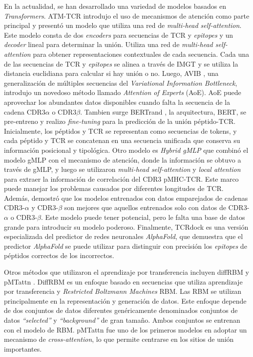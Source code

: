 En la actualidad, se han desarrollado una variedad de modelos basados en \textit{Transformers}. ATM-TCR \citep{cai2022atm} introdujo el uso de mecanismos de atención como parte principal y presentó un modelo que utiliza una red de \textit{multi-head self-attention}. Este modelo consta de dos \textit{encoders} para secuencias de TCR y \textit{epitopes} y un \textit{decoder} lineal para determinar la unión. Utiliza una red de \textit{multi-head self-attention} para obtener representaciones contextuales de cada secuencia. Cada una de las secuencias de TCR y \textit{epitopes} se alinea a través de IMGT y se utiliza la distancia euclidiana para calcular si hay unión o no. Luego, AVIB \citep{10.1093/bioinformatics/btac820}, una generalización de múltiples secuencias del \textit{Variational Information Bottleneck}, introdujo un novedoso método llamado \textit{Attention of Experts} (AoE). AoE puede aprovechar los abundantes datos disponibles cuando falta la secuencia de la cadena CDR3$\alpha$ o CDR3$\beta$. Tambien surge BERTrand \citep{myronov2023bertrand}, la arquitectura, BERT, se pre-entreno y realizo \textit{fine-tuning} para la predicción de la unión péptido-TCR. Inicialmente, los péptidos y TCR se representan como secuencias de tokens, y cada péptido y TCR se concatenan en una secuencia unificada que conserva su información posicional y tipológica. Otro modelo es \textit{Hybrid gMLP} \citep{zhang2023hybrid} que combinó el modelo gMLP con el mecanismo de atención, donde la información se obtuvo a través de gMLP, y luego se utilizaron \textit{multi-head self-attention} y \textit{local attention} para extraer la información de correlación del CDR3 pMHC-TCR. Este marco puede manejar los problemas causados por diferentes longitudes de TCR. Además, demostró que los modelos entrenados con datos emparejados de cadenas CDR3-$\alpha$ y CDR3-$\beta$ son mejores que aquellos entrenados solo con datos de CDR3-$\alpha$ o CDR3-$\beta$. Este modelo puede tener potencial, pero le falta una base de datos grande para introducir su modelo poderoso. Finalmente, TCRdock \citep{bradley2023structure} es una versión especializada del predictor de redes neuronales \textit{AlphaFold}, que demuestra que el predictor \textit{AlphaFold} se puede utilizar para distinguir con precisión los \textit{epitopes} de péptidos correctos de los incorrectos. 

Otros métodos que utilizaron el aprendizaje por transferencia incluyen diffRBM \citep{bravi2023transfer} y pMTattn \citep{9994875}. DiffRBM es un enfoque basado en secuencias que utiliza aprendizaje por transferencia y \textit{Restricted Boltzmann Machines} RBM. Las RBM se utilizan principalmente en la representación y generación de datos. Este enfoque depende de dos conjuntos de datos diferentes genéricamente denominados conjuntos de datos \textit{``selected''} y \textit{``background''} de gran tamaño. Ambos conjuntos se entrenan con el modelo de RBM. pMTattn fue uno de los primeros modelos en adoptar un mecanismo de \textit{cross-attention}, lo que permite centrarse en los sitios de unión importantes. 


